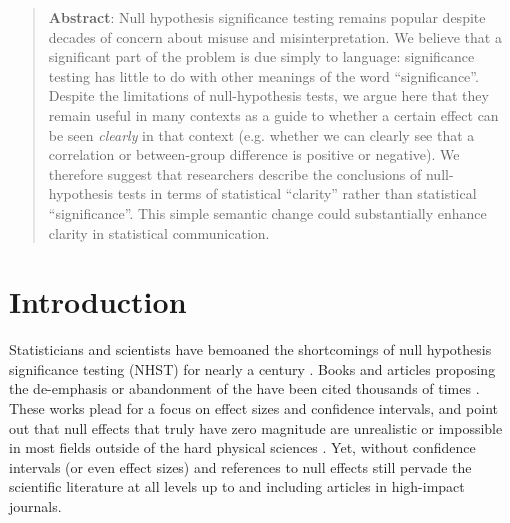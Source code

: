 \begin{abstract}

  \textbf{Abstract}: Null hypothesis significance testing remains popular despite decades of concern about misuse and misinterpretation. We believe that a significant part of the problem is due simply to language: significance testing has little to do with other meanings of the word ``significance''. Despite the limitations of null-hypothesis tests, we argue here that they remain useful in many contexts as a guide to whether a certain effect can be seen \emph{clearly} in that context (e.g. whether we can clearly see that a correlation or between-group difference is positive or negative). We therefore suggest that researchers describe the conclusions of null-hypothesis tests in terms of statistical ``clarity'' rather than statistical ``significance''. This simple semantic change could substantially enhance clarity in statistical communication.

\end{abstract}

\flushbottom
\maketitle
\newpage
\thispagestyle{empty}

\clearpage

\section*{Introduction}

Statisticians and scientists have bemoaned the shortcomings of null hypothesis significance testing (NHST) for nearly a century \citep{Cohen1994}.
Books and articles proposing the de-emphasis or abandonment of the \pval have been cited thousands of times \citep{Cohen1994, Goodman1999, Wilkinson1999, ZiliakandMcCloskey2008, WassersteinandLazar2016}. These works plead for a focus on effect sizes and confidence intervals, and point out that null effects that truly have zero magnitude are unrealistic or impossible in most fields outside of the hard physical sciences \citep{Meehl1990, Tukey1991, Cohen1994}. Yet, \pvals without confidence intervals (or even effect sizes) and references to null effects still pervade the scientific literature at all levels up to and including articles in high-impact journals.

